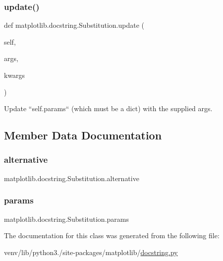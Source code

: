 \subsubsection{\texorpdfstring{update()}{update()}}
{\footnotesize\ttfamily def matplotlib.\+docstring.\+Substitution.\+update (\begin{DoxyParamCaption}\item[{}]{self,  }\item[{}]{args,  }\item[{}]{kwargs }\end{DoxyParamCaption})}

\begin{DoxyVerb}Update ``self.params`` (which must be a dict) with the supplied args.
\end{DoxyVerb}
 

\subsection{Member Data Documentation}
\mbox{\label{classmatplotlib_1_1docstring_1_1Substitution_a276f9c722ef3324ff1c94800e0dc3759}} 
\subsubsection{\texorpdfstring{alternative}{alternative}}
{\footnotesize\ttfamily matplotlib.\+docstring.\+Substitution.\+alternative\hspace{0.3cm}{\ttfamily [static]}}

\mbox{\label{classmatplotlib_1_1docstring_1_1Substitution_af427316b5e8f50e6458018c5c0ea2d18}} 
\subsubsection{\texorpdfstring{params}{params}}
{\footnotesize\ttfamily matplotlib.\+docstring.\+Substitution.\+params}



The documentation for this class was generated from the following file\+:\begin{DoxyCompactItemize}
\item 
venv/lib/python3./site-\/packages/matplotlib/\hyperlink{docstring_8py}{docstring.\+py}\end{DoxyCompactItemize}
